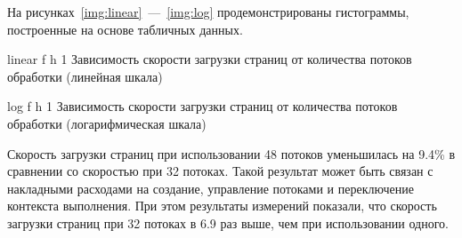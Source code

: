 \clearpage

На рисунках~\ref{img:linear}~---~\ref{img:log} продемонстрированы гистограммы, построенные на основе табличных данных.

{linear}
{f}
{h}
{1 \textwidth}
{Зависимость скорости загрузки страниц от количества потоков обработки (линейная шкала)}

{log}
{f}
{h}
{1 \textwidth}
{Зависимость скорости загрузки страниц от количества потоков обработки (логарифмическая шкала)}

Скорость загрузки страниц при использовании 48 потоков уменьшилась на 9.4\% в сравнении со скоростью при 32 потоках. Такой результат может быть связан с накладными расходами на создание, управление потоками и переключение контекста выполнения. При этом результаты измерений показали, что скорость загрузки страниц при 32 потоках в 6.9 раз выше, чем при использовании одного.
